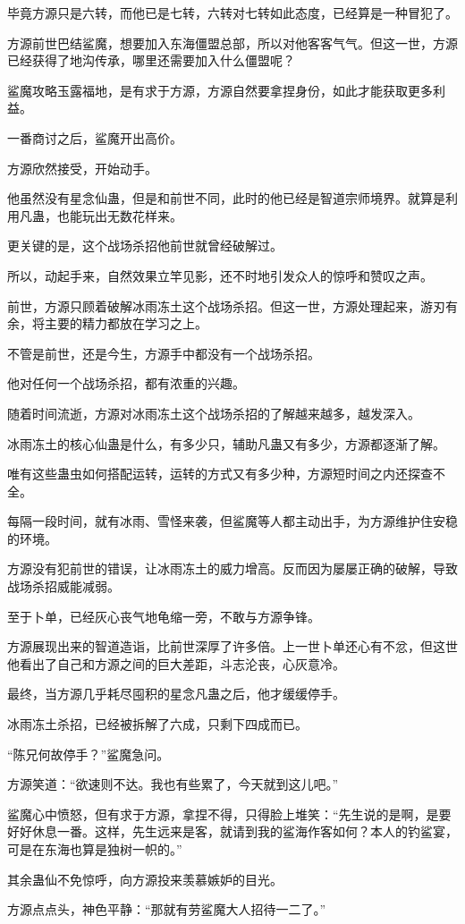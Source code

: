 \begin{this_body}
毕竟方源只是六转，而他已是七转，六转对七转如此态度，已经算是一种冒犯了。

方源前世巴结鲨魔，想要加入东海僵盟总部，所以对他客客气气。但这一世，方源已经获得了地沟传承，哪里还需要加入什么僵盟呢？

鲨魔攻略玉露福地，是有求于方源，方源自然要拿捏身份，如此才能获取更多利益。

一番商讨之后，鲨魔开出高价。

方源欣然接受，开始动手。

他虽然没有星念仙蛊，但是和前世不同，此时的他已经是智道宗师境界。就算是利用凡蛊，也能玩出无数花样来。

更关键的是，这个战场杀招他前世就曾经破解过。

所以，动起手来，自然效果立竿见影，还不时地引发众人的惊呼和赞叹之声。

前世，方源只顾着破解冰雨冻土这个战场杀招。但这一世，方源处理起来，游刃有余，将主要的精力都放在学习之上。

不管是前世，还是今生，方源手中都没有一个战场杀招。

他对任何一个战场杀招，都有浓重的兴趣。

随着时间流逝，方源对冰雨冻土这个战场杀招的了解越来越多，越发深入。

冰雨冻土的核心仙蛊是什么，有多少只，辅助凡蛊又有多少，方源都逐渐了解。

唯有这些蛊虫如何搭配运转，运转的方式又有多少种，方源短时间之内还探查不全。

每隔一段时间，就有冰雨、雪怪来袭，但鲨魔等人都主动出手，为方源维护住安稳的环境。

方源没有犯前世的错误，让冰雨冻土的威力增高。反而因为屡屡正确的破解，导致战场杀招威能减弱。

至于卜单，已经灰心丧气地龟缩一旁，不敢与方源争锋。

方源展现出来的智道造诣，比前世深厚了许多倍。上一世卜单还心有不忿，但这世他看出了自己和方源之间的巨大差距，斗志沦丧，心灰意冷。

最终，当方源几乎耗尽囤积的星念凡蛊之后，他才缓缓停手。

冰雨冻土杀招，已经被拆解了六成，只剩下四成而已。

“陈兄何故停手？”鲨魔急问。

方源笑道：“欲速则不达。我也有些累了，今天就到这儿吧。”

鲨魔心中愤怒，但有求于方源，拿捏不得，只得脸上堆笑：“先生说的是啊，是要好好休息一番。这样，先生远来是客，就请到我的鲨海作客如何？本人的钓鲨宴，可是在东海也算是独树一帜的。”

其余蛊仙不免惊呼，向方源投来羡慕嫉妒的目光。

方源点点头，神色平静：“那就有劳鲨魔大人招待一二了。”

\end{this_body}


